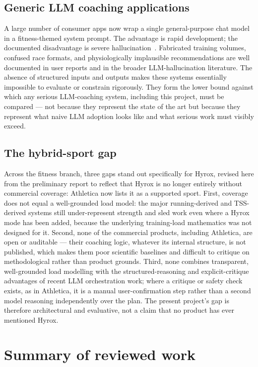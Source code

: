 \subsection{Generic LLM coaching applications}

A large number of consumer apps now wrap a single general-purpose chat model in a fitness-themed system prompt. The advantage is rapid development; the documented disadvantage is severe hallucination~\cite{huang2023hallucination}. Fabricated training volumes, confused race formats, and physiologically implausible recommendations are well documented in user reports and in the broader LLM-hallucination literature. The absence of structured inputs and outputs makes these systems essentially impossible to evaluate or constrain rigorously. They form the lower bound against which any serious LLM-coaching system, including this project, must be compared --- not because they represent the state of the art but because they represent what naive LLM adoption looks like and what serious work must visibly exceed.

\subsection{The hybrid-sport gap}

Across the fitness branch, three gaps stand out specifically for Hyrox, revised here from the preliminary report to reflect that Hyrox is no longer entirely without commercial coverage: Athletica now lists it as a supported sport. First, coverage does not equal a well-grounded load model: the major running-derived and TSS-derived systems still under-represent strength and sled work even where a Hyrox mode has been added, because the underlying training-load mathematics was not designed for it. Second, none of the commercial products, including Athletica, are open or auditable --- their coaching logic, whatever its internal structure, is not published, which makes them poor scientific baselines and difficult to critique on methodological rather than product grounds. Third, none combines transparent, well-grounded load modelling with the structured-reasoning and explicit-critique advantages of recent LLM orchestration work; where a critique or safety check exists, as in Athletica, it is a manual user-confirmation step rather than a second model reasoning independently over the plan. The present project's gap is therefore architectural and evaluative, not a claim that no product has ever mentioned Hyrox.

\section{Summary of reviewed work}

